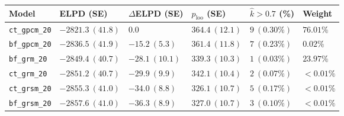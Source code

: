 \documentclass[
  man,
  floatsintext,
  longtable,
  nolmodern,
  notxfonts,
  notimes,
  colorlinks=true,linkcolor=blue,citecolor=blue,urlcolor=blue]{apa7}
\begin{document}
\begin{table}

{\caption{{LOO-CV comparison of six candidate models. Models are ordered
by ELPD. \(\Delta\)ELPD and its SE are computed relative to the
best-fitting model. \(\hat{k} > 0.7\) denotes the number of observations
with problematic Pareto \(\hat{k}\) diagnostic values. Stacking weights
were computed via
\texttt{loo\_model\_weights()}.}{\label{tbl-loo-final-compare}}}
\vspace{-20pt}}

\begin{longtable}[]{@{}
  >{\raggedright\arraybackslash}p{}
  >{\raggedright\arraybackslash}p{}
  >{\raggedright\arraybackslash}p{}
  >{\raggedright\arraybackslash}p{}
  >{\raggedright\arraybackslash}p{}
  >{\raggedright\arraybackslash}p{}@{}}
\toprule\noalign{}
\begin{minipage}[b]{\linewidth}\raggedright
Model
\end{minipage} & \begin{minipage}[b]{\linewidth}\raggedright
ELPD (SE)
\end{minipage} & \begin{minipage}[b]{\linewidth}\raggedright
\(\Delta\)ELPD (SE)
\end{minipage} & \begin{minipage}[b]{\linewidth}\raggedright
\(p_{\text{loo}}\) (SE)
\end{minipage} & \begin{minipage}[b]{\linewidth}\raggedright
\(\hat{k} > 0.7\) (\%)
\end{minipage} & \begin{minipage}[b]{\linewidth}\raggedright
Weight
\end{minipage} \\
\midrule\noalign{}
\endhead
\bottomrule\noalign{}
\endlastfoot
\texttt{ct\_gpcm\_20} & \(-2821.3 \ (41.8)\) & \(0.0\) &
\(364.4 \ (12.1)\) & \(9 \ (0.30\%)\) & \(76.01\%\) \\
\texttt{bf\_gpcm\_20} & \(-2836.5 \ (41.9)\) & \(-15.2 \ (5.3)\) &
\(361.4 \ (11.8)\) & \(7 \ (0.23\%)\) & \(0.02\%\) \\
\texttt{bf\_grm\_20} & \(-2849.4 \ (40.7)\) & \(-28.1 \ (10.1)\) &
\(339.3 \ (10.3)\) & \(1 \ (0.03\%)\) & \(23.97\%\) \\
\texttt{ct\_grm\_20} & \(-2851.2 \ (40.7)\) & \(-29.9 \ (9.9)\) &
\(342.1 \ (10.4)\) & \(2 \ (0.07\%)\) & \(< 0.01\%\) \\
\texttt{ct\_grsm\_20} & \(-2855.3 \ (41.0)\) & \(-34.0 \ (8.8)\) &
\(326.1 \ (10.7)\) & \(5 \ (0.17\%)\) & \(< 0.01\%\) \\
\texttt{bf\_grsm\_20} & \(-2857.6 \ (41.0)\) & \(-36.3 \ (8.9)\) &
\(327.0 \ (10.7)\) & \(3 \ (0.10\%)\) & \(< 0.01\%\) \\
\end{longtable}

\end{table}
\end{document}
